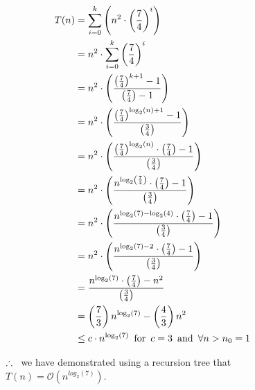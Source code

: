 \documentclass{article}
\begin{document}
\begin{figure}[!ht]
\begin{minipage}{0.9\textwidth}
                    \begin{align*}
                        T(n) &= \sum_{i=0}^{k} \left( n^{2} \cdot \left(\frac{7}{4}\right)^{i}\right)\\
                             &= n^{2} \cdot \sum_{i=0}^{k} \left(\frac{7}{4}\right)^{i}\\
                             &= n^{2} \cdot \left( \frac{\left(\frac{7}{4}\right)^{k+1} - 1} {\left(\frac{7}{4}\right) -1 } \right)\\
                             &= n^{2} \cdot \left( \frac{\left(\frac{7}{4}\right)^{\log_{2}(n)+1} - 1} {\left(\frac{3}{4}\right)} \right)\\
                             &= n^{2} \cdot \left( \frac{\left(\frac{7}{4}\right)^{\log_{2}(n)} \cdot \left(\frac{7}{4}\right) - 1} {\left(\frac{3}{4}\right)} \right)\\
                             &= n^{2} \cdot \left( \frac{n^{\log_{2}\left(\frac{7}{4}\right)} \cdot \left(\frac{7}{4}\right) - 1} {\left(\frac{3}{4}\right)} \right)\\
                             &= n^{2} \cdot \left( \frac{n^{\log_{2}(7)-\log_{2}(4)} \cdot \left(\frac{7}{4}\right) - 1} {\left(\frac{3}{4}\right)} \right)\\
                             &= n^{2} \cdot \left( \frac{n^{\log_{2}(7)-2} \cdot \left(\frac{7}{4}\right) - 1} {\left(\frac{3}{4}\right)} \right)\\
                             &= \frac{n^{\log_{2}(7)} \cdot \left(\frac{7}{4}\right) - n^{2}} {\left(\frac{3}{4}\right)}\\
                             &= \left(\frac{7}{3}\right)n^{\log_{2}(7)} - \left(\frac{4}{3}\right)n^{2} \\
                             &\leq c \cdot n^{\log_{2}(7)} \hspace*{5pt} \text{for}
                             \hspace*{5pt} c = 3 \hspace*{5pt} \text{and} \hspace*{5pt} \forall n > n_{0} = 1
                    \end{align*}

                    $\therefore \hspace*{5pt}$ we have demonstrated using a recursion tree that $T(n) = \mathcal{O}(n^{log_{2}(7)})$.

                \end{minipage}
            \end{figure}
        
\end{document}
